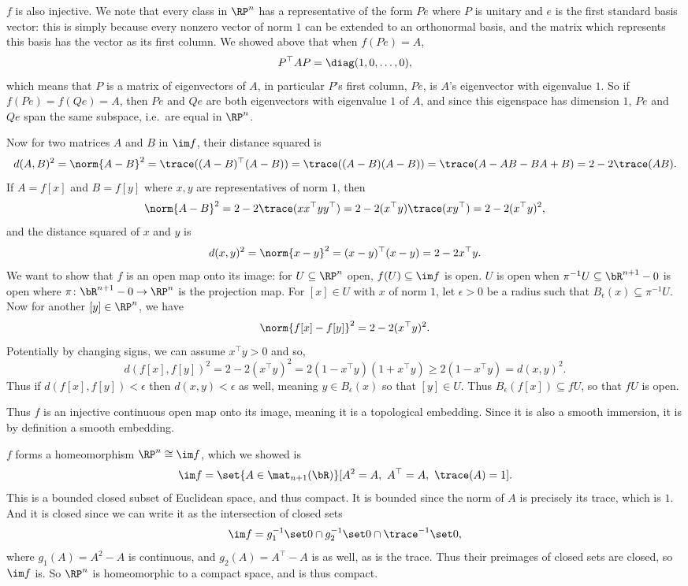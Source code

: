     $f$ is also injective.
    We note that every class in $\RP^n$ has a representative of the form $Pe$ where $P$ is unitary and $e$ is the first
    standard basis vector: this is simply because every nonzero vector of norm $1$ can be extended to an orthonormal basis,
    and the matrix which represents this basis has the vector as its first column.
    We showed above that when $f(Pe)=A$,
    $$ P^\top AP = \diag(1,0,\dots,0) , $$
    which means that $P$ is a matrix of eigenvectors of $A$, in particular $P$'s first column, $Pe$, is $A$'s eigenvector with
    eigenvalue $1$.
    So if $f(Pe)=f(Qe)=A$, then $Pe$ and $Qe$ are both eigenvectors with eigenvalue $1$ of $A$, and since this eigenspace has
    dimension $1$, $Pe$ and $Qe$ span the same subspace, i.e.\ are equal in $\RP^n$.

    Now for two matrices $A$ and $B$ in $\im f$, their distance squared is
    $$ d(A,B)^2 = \norm{A-B}^2 = \trace((A-B)^\top(A-B)) = \trace((A-B)(A-B)) = \trace(A-AB-BA+B) = 2 - 2\trace(AB) . $$
    If $A=f[x]$ and $B=f[y]$ where $x,y$ are representatives of norm $1$, then
    $$ \norm{A-B}^2 = 2 - 2\trace(xx^\top yy^\top) = 2 - 2(x^\top y)\trace(xy^\top) = 2 - 2(x^\top y)^2 , $$
    and the distance squared of $x$ and $y$ is
    $$ d(x,y)^2 = \norm{x-y}^2 = (x-y)^\top(x-y) = 2 - 2x^\top y . $$
    We want to show that $f$ is an open map onto its image: for $U\subseteq\RP^n$ open, $f(U)\subseteq\im f$ is open.
    $U$ is open when $\pi^{-1}U\subseteq\bR^{n+1}-0$ is open where $\pi\colon\bR^{n+1}-0\to\RP^n$ is the projection map.
    For $[x]\in U$ with $x$ of norm $1$, let $\epsilon>0$ be a radius such that $B_\epsilon(x)\subseteq\pi^{-1}U$.
    Now for another $[y]\in\RP^n$, we have
    $$ \norm{f[x] - f[y]}^2 = 2 - 2(x^\top y)^2 . $$
    Potentially by changing signs, we can assume $x^\top y>0$ and so,
    $$ d(f[x],f[y])^2 = 2 - 2(x^\top y)^2 = 2(1-x^\top y)(1+x^\top y) \geq 2(1-x^\top y) = d(x,y)^2 . $$
    Thus if $d(f[x],f[y])<\epsilon$ then $d(x,y)<\epsilon$ as well, meaning $y\in B_\epsilon(x)$ so that $[y]\in U$.
    Thus $B_\epsilon(f[x])\subseteq fU$, so that $fU$ is open.

    Thus $f$ is an injective continuous open map onto its image, meaning it is a topological embedding.
    Since it is also a smooth immersion, it is by definition a smooth embedding.

    \item $f$ forms a homeomorphism $\RP^n\cong\im f$, which we showed is
    $$ \im f = \set{A\in\mat_{n+1}(\bR)}[A^2=A,\ A^\top=A,\ \trace(A)=1] . $$
    This is a bounded closed subset of Euclidean space, and thus compact.
    It is bounded since the norm of $A$ is precisely its trace, which is $1$.
    And it is closed since we can write it as the intersection of closed sets
    $$ \im f = g_1^{-1}\set0 \cap g_2^{-1}\set0 \cap \trace^{-1}\set0 , $$
    where $g_1(A)=A^2-A$ is continuous, and $g_2(A)=A^\top-A$ is as well, as is the trace.
    Thus their preimages of closed sets are closed, so $\im f$ is.
    So $\RP^n$ is homeomorphic to a compact space, and is thus compact.
\eenum

